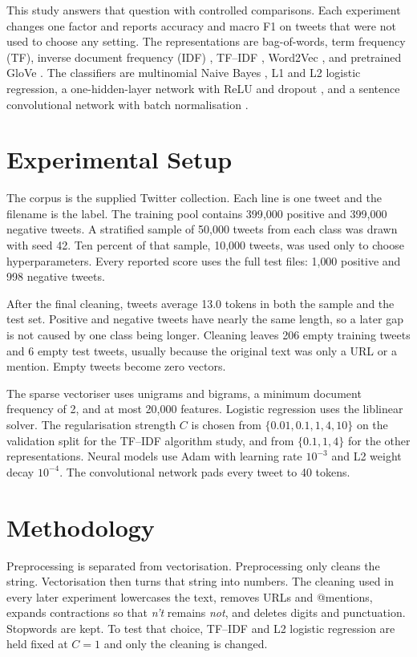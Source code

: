 \documentclass[conference]{IEEEtran}
\begin{document}
This study answers that question with controlled comparisons. Each experiment changes one factor and reports accuracy and macro F1 on tweets that were not used to choose any setting. The representations are bag-of-words, term frequency (TF), inverse document frequency (IDF) \cite{sparckjones1972idf}, TF--IDF \cite{salton1988term}, Word2Vec \cite{mikolov2013word2vec}, and pretrained GloVe \cite{pennington2014glove}. The classifiers are multinomial Naive Bayes \cite{mccallum1998nb}, L1 and L2 logistic regression, a one-hidden-layer network with ReLU and dropout \cite{srivastava2014dropout}, and a sentence convolutional network \cite{kim2014cnn} with batch normalisation \cite{ioffe2015batchnorm}.

\section{Experimental Setup}
The corpus is the supplied Twitter collection. Each line is one tweet and the filename is the label. The training pool contains 399{,}000 positive and 399{,}000 negative tweets. A stratified sample of 50{,}000 tweets from each class was drawn with seed 42. Ten percent of that sample, 10{,}000 tweets, was used only to choose hyperparameters. Every reported score uses the full test files: 1{,}000 positive and 998 negative tweets.

After the final cleaning, tweets average 13.0 tokens in both the sample and the test set. Positive and negative tweets have nearly the same length, so a later gap is not caused by one class being longer. Cleaning leaves 206 empty training tweets and 6 empty test tweets, usually because the original text was only a URL or a mention. Empty tweets become zero vectors.

The sparse vectoriser uses unigrams and bigrams, a minimum document frequency of 2, and at most 20{,}000 features. Logistic regression uses the liblinear solver. The regularisation strength $C$ is chosen from $\{0.01, 0.1, 1, 4, 10\}$ on the validation split for the TF--IDF algorithm study, and from $\{0.1, 1, 4\}$ for the other representations. Neural models use Adam with learning rate $10^{-3}$ and L2 weight decay $10^{-4}$. The convolutional network pads every tweet to 40 tokens.

\section{Methodology}
Preprocessing is separated from vectorisation. Preprocessing only cleans the string. Vectorisation then turns that string into numbers. The cleaning used in every later experiment lowercases the text, removes URLs and @mentions, expands contractions so that \emph{n't} remains \emph{not}, and deletes digits and punctuation. Stopwords are kept. To test that choice, TF--IDF and L2 logistic regression are held fixed at $C=1$ and only the cleaning is changed.
\end{document}
